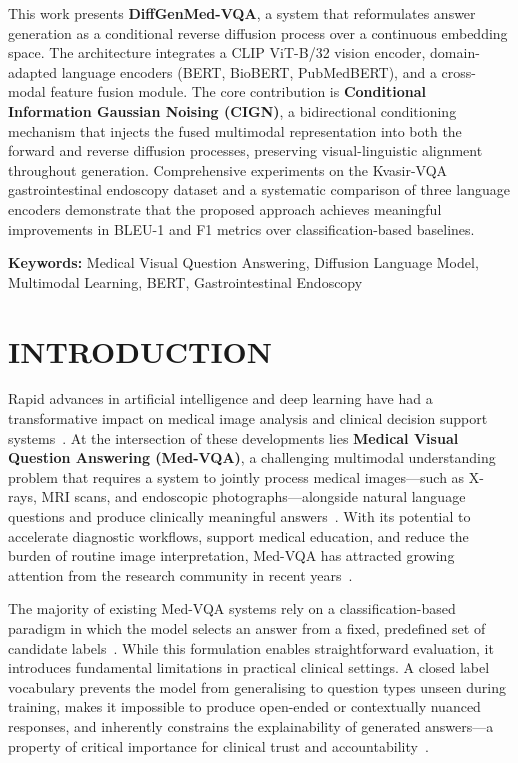\documentclass[9pt]{report}
\begin{document}
This work presents \textbf{DiffGenMed-VQA}, a system that reformulates answer generation as a conditional reverse diffusion process over a continuous embedding space. The architecture integrates a CLIP ViT-B/32 vision encoder, domain-adapted language encoders (BERT, BioBERT, PubMedBERT), and a cross-modal feature fusion module. The core contribution is \textbf{Conditional Information Gaussian Noising (CIGN)}, a bidirectional conditioning mechanism that injects the fused multimodal representation into both the forward and reverse diffusion processes, preserving visual-linguistic alignment throughout generation. Comprehensive experiments on the Kvasir-VQA gastrointestinal endoscopy dataset and a systematic comparison of three language encoders demonstrate that the proposed approach achieves meaningful improvements in BLEU-1 and F1 metrics over classification-based baselines.

\vspace{0.5cm}

\noindent \textbf{Keywords:} Medical Visual Question Answering, Diffusion Language Model, Multimodal Learning, BERT, Gastrointestinal Endoscopy

\tableofcontents
\newpage

\chapter{INTRODUCTION}

Rapid advances in artificial intelligence and deep learning have had a transformative impact on medical image analysis and clinical decision support systems~\cite{dong2025,kabir2024}. At the intersection of these developments lies \textbf{Medical Visual Question Answering (Med-VQA)}, a challenging multimodal understanding problem that requires a system to jointly process medical images---such as X-rays, MRI scans, and endoscopic photographs---alongside natural language questions and produce clinically meaningful answers~\cite{antol2015,lau2018}. With its potential to accelerate diagnostic workflows, support medical education, and reduce the burden of routine image interpretation, Med-VQA has attracted growing attention from the research community in recent years~\cite{slake,kvasir}.

The majority of existing Med-VQA systems rely on a classification-based paradigm in which the model selects an answer from a fixed, predefined set of candidate labels~\cite{mevf,ban}. While this formulation enables straightforward evaluation, it introduces fundamental limitations in practical clinical settings. A closed label vocabulary prevents the model from generalising to question types unseen during training, makes it impossible to produce open-ended or contextually nuanced responses, and inherently constrains the explainability of generated answers---a property of critical importance for clinical trust and accountability~\cite{lapa}.
\end{document}
